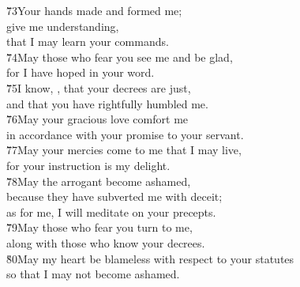 \begin{poetry}
\poeml \v{73}Your hands made and formed me; \\
\poemll    give me understanding, \\
\poemlll       that I may learn your commands. \\
\poeml \v{74}May those who fear you see me and be glad, \\
\poemll    for I have hoped in your word. \\
\poeml \v{75}I know, , that your decrees are just, \\
\poemll    and that you have rightfully humbled me. \\
\poeml \v{76}May your gracious love comfort me \\
\poemll    in accordance with your promise to your servant. \\
\poeml \v{77}May your mercies come to me that I may live, \\
\poemll    for your instruction is my delight. \\
\poeml \v{78}May the arrogant become ashamed, \\
\poemll    because they have subverted me with deceit; \\
\poemlll       as for me, I will meditate on your precepts. \\
\poeml \v{79}May those who fear you turn to me, \\
\poemll    along with those who know your decrees. \\
\poeml \v{80}May my heart be blameless with respect to your statutes \\
\poemll    so that I may not become ashamed.
\end{poetry}

